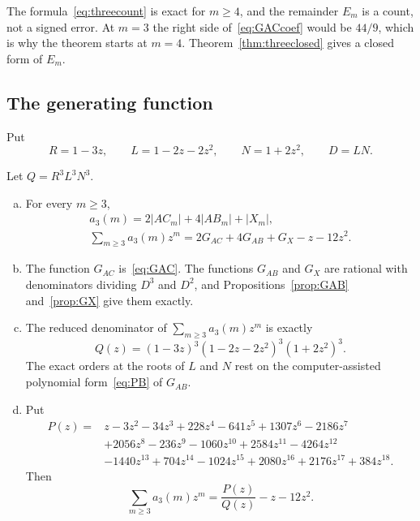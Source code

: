 The formula~\eqref{eq:threecount} is exact for $m\ge4$, and the remainder $E_m$ is a count,
not a signed error. At $m=3$ the right side of~\eqref{eq:GACcoef} would be $44/9$, which is
why the theorem starts at $m=4$. Theorem~\ref{thm:threeclosed} gives a closed form of $E_m$.

\subsection{The generating function}

Put
\[
R=1-3z,\qquad L=1-2z-2z^2,\qquad N=1+2z^2,\qquad D=LN.
\]

\begin{theorem}\label{thm:threegf}
Let $Q=R^3L^3N^3$.
\begin{enumerate}[(a)]
\item For every $m\ge3$,
\begin{gather*}
a_3(m)=2|AC_m|+4|AB_m|+|X_m|,\\
\sum_{m\ge3}a_3(m)z^m=2G_{AC}+4G_{AB}+G_X-z-12z^2.
\end{gather*}
\item The function $G_{AC}$ is~\eqref{eq:GAC}. The functions $G_{AB}$ and $G_X$ are rational
with denominators dividing $D^3$ and $D^2$, and Propositions~\ref{prop:GAB} and~\ref{prop:GX}
give them exactly.
\item The reduced denominator of $\sum_{m\ge3}a_3(m)z^m$ is exactly
\[
Q(z)=(1-3z)^3(1-2z-2z^2)^3(1+2z^2)^3.
\]
The exact orders at the roots of $L$ and $N$ rest on the computer-assisted polynomial
form~\eqref{eq:PB} of $G_{AB}$.
\item Put
\begin{align*}
P(z)={}&z-3z^2-34z^3+228z^4-641z^5+1307z^6-2186z^7\\
&+2056z^8-236z^9-1060z^{10}+2584z^{11}-4264z^{12}\\
&-1440z^{13}+704z^{14}-1024z^{15}+2080z^{16}+2176z^{17}+384z^{18}.
\end{align*}
Then
\begin{equation}\label{eq:PQ}
\sum_{m\ge3}a_3(m)z^m=\frac{P(z)}{Q(z)}-z-12z^2.
\end{equation}
\end{enumerate}
\end{theorem}

